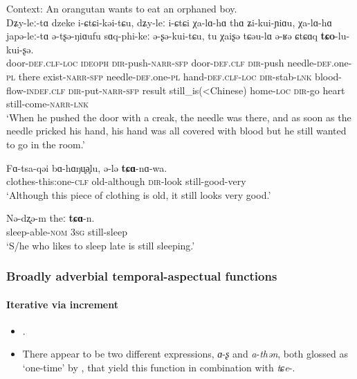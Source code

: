 \begin{exe}
	\ex\label{exAppendixQiang1}
	Context: An orangutan wants to eat an orphaned boy.\\
	\gll Dʑy-leː-tɑ dzeke i-ɕtɕi-kəi-tɕu, dʑy-leː i-ɕtɕi χa-lɑ-hɑ thɑ ʑi-kui-ɲiɑu, χa-lɑ-hɑ japə-leː-tɑ ə-tʂə-ŋiɑufu sɑq-phi-keː ə-ʂə-kui-tɕu, tu χaiʂə tɕəu-lɑ ə-ʁə ɕtɕɑq \textbf{tɕo}-lu-kui-ʂə.\\
	door-\textsc{def}.\textsc{clf}-\textsc{loc} \textsc{ideoph} \textsc{dir}-push-\textsc{narr}-\textsc{sfp} door-\textsc{def}.\textsc{clf} \textsc{dir}-push needle-\textsc{def}.one-\textsc{pl} there exist-\textsc{narr}-\textsc{sfp} needle-\textsc{def}.one-\textsc{pl} hand-\textsc{def}.\textsc{clf}-\textsc{loc} \textsc{dir}-stab-\textsc{lnk} blood-flow-\textsc{indef}.\textsc{clf} \textsc{dir}-put-\textsc{narr}-\textsc{sfp} result still\_is(<Chinese) home-\textsc{loc} \textsc{dir}-go heart still-come-\textsc{narr}-\textsc{lnk}\\
	\glt \lq When he pushed the door with a creak, the needle was there, and as soon as the needle pricked his hand, his hand was all covered with blood but he still wanted to go in the room.' \parencite[264, 268]{LaPollaHuang2003}

	\ex\label{exAppendixQiang2}
	\gll Fɑ-tsa-qəi bɑ-hɑŋu̥ə̥lu, ə-lə \textbf{tɕɑ}-nɑ-wa.\\
	clothes-this:one-\textsc{clf} old-although \textsc{dir}-look still-good-very\\
	\glt \lq Although this piece of clothing is old, it still looks very good.\rq{ }\parencite[245]{LaPollaHuang2003}

	\ex\label{exAppendixQiang3}
	\gll Nə-dʐə-m theː \textbf{tɕɑ}-n.\\
	sleep-able-\textsc{nom} 3\textsc{sg} still-sleep\\
	\glt \lq S/he who likes to sleep late is still sleeping.\rq{ }\parencite[228]{LaPollaHuang2003}
\end{exe}

\subsubsection{Broadly adverbial temporal-aspectual functions}

\paragraph{Iterative via increment}
\label{appendixNorthernQiangIterativeIncrement}
\begin{itemize}
	\item \textcite[170]{LaPollaHuang2003}.
	\item There appear to be two different expressions,  \mbox{\textit{ɑ}-\textit{ʂ}} and \mbox{\textit{a}-\textit{thən}}, both glossed as \lq one-time' by \textcite{LaPollaHuang2003}, that yield this function in combination with \mbox{\textit{tɕe}-}.
\end{itemize}

